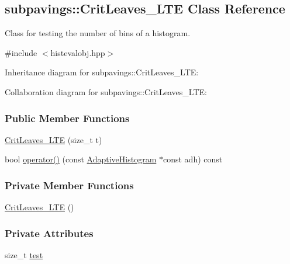 \hypertarget{classsubpavings_1_1CritLeaves__LTE}{\subsection{subpavings\-:\-:\-Crit\-Leaves\-\_\-\-L\-T\-E \-Class \-Reference}
\label{classsubpavings_1_1CritLeaves__LTE}
}


\-Class for testing the number of bins of a histogram.  




{\ttfamily \#include $<$histevalobj.\-hpp$>$}



\-Inheritance diagram for subpavings\-:\-:\-Crit\-Leaves\-\_\-\-L\-T\-E\-:


\-Collaboration diagram for subpavings\-:\-:\-Crit\-Leaves\-\_\-\-L\-T\-E\-:
\subsubsection*{\-Public \-Member \-Functions}
\begin{DoxyCompactItemize}
\item 
\hyperlink{classsubpavings_1_1CritLeaves__LTE_a9944c9e614b649ed5c6f11c6ba086d88}{\-Crit\-Leaves\-\_\-\-L\-T\-E} (size\-\_\-t t)
\item 
bool \hyperlink{classsubpavings_1_1CritLeaves__LTE_a09d5d8f311bd0b811208e329a26514a5}{operator()} (const \hyperlink{classsubpavings_1_1AdaptiveHistogram}{\-Adaptive\-Histogram} $\ast$const adh) const 
\end{DoxyCompactItemize}
\subsubsection*{\-Private \-Member \-Functions}
\begin{DoxyCompactItemize}
\item 
\hyperlink{classsubpavings_1_1CritLeaves__LTE_a8d16f0386d2fd08810283a1c0b1b7910}{\-Crit\-Leaves\-\_\-\-L\-T\-E} ()
\end{DoxyCompactItemize}
\subsubsection*{\-Private \-Attributes}
\begin{DoxyCompactItemize}
\item 
size\-\_\-t \hyperlink{classsubpavings_1_1CritLeaves__LTE_a8fd26c00ab5b5b22f0620e0d32002256}{test}
\end{DoxyCompactItemize}


